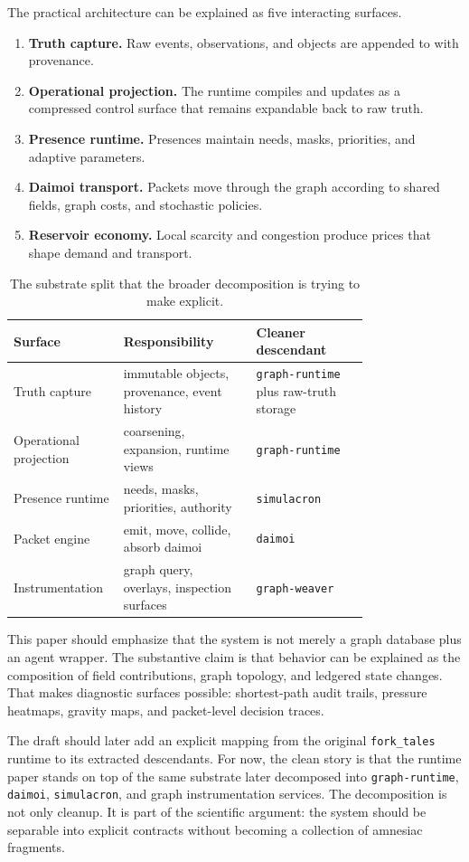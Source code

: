 The practical architecture can be explained as five interacting surfaces.

\begin{enumerate}[leftmargin=1.5em]
  \item \textbf{Truth capture.} Raw events, observations, and objects are appended to \truthgraph{} with provenance.
  \item \textbf{Operational projection.} The runtime compiles and updates \viewgraph{} as a compressed control surface that remains expandable back to raw truth.
  \item \textbf{Presence runtime.} Presences maintain needs, masks, priorities, and adaptive parameters.
  \item \textbf{Daimoi transport.} Packets move through the graph according to shared fields, graph costs, and stochastic policies.
  \item \textbf{Reservoir economy.} Local scarcity and congestion produce prices that shape demand and transport.
\end{enumerate}

\begin{table}[t]
\centering
\small
\begin{tabular}{p{0.17\linewidth}p{0.33\linewidth}p{0.28\linewidth}}
\toprule
Surface & Responsibility & Cleaner descendant \\
\midrule
Truth capture & immutable objects, provenance, event history & \texttt{graph-runtime} plus raw-truth storage \\
Operational projection & coarsening, expansion, runtime views & \texttt{graph-runtime} \\
Presence runtime & needs, masks, priorities, authority & \texttt{simulacron} \\
Packet engine & emit, move, collide, absorb daimoi & \texttt{daimoi} \\
Instrumentation & graph query, overlays, inspection surfaces & \texttt{graph-weaver} \\
\bottomrule
\end{tabular}
\caption{The substrate split that the broader decomposition is trying to make explicit.}
\end{table}

This paper should emphasize that the system is not merely a graph database plus an agent wrapper. The substantive claim is that behavior can be explained as the composition of field contributions, graph topology, and ledgered state changes. That makes diagnostic surfaces possible: shortest-path audit trails, pressure heatmaps, gravity maps, and packet-level decision traces.

The draft should later add an explicit mapping from the original \texttt{fork\_tales} runtime to its extracted descendants. For now, the clean story is that the runtime paper stands on top of the same substrate later decomposed into \texttt{graph-runtime}, \texttt{daimoi}, \texttt{simulacron}, and graph instrumentation services. The decomposition is not only cleanup. It is part of the scientific argument: the system should be separable into explicit contracts without becoming a collection of amnesiac fragments.
